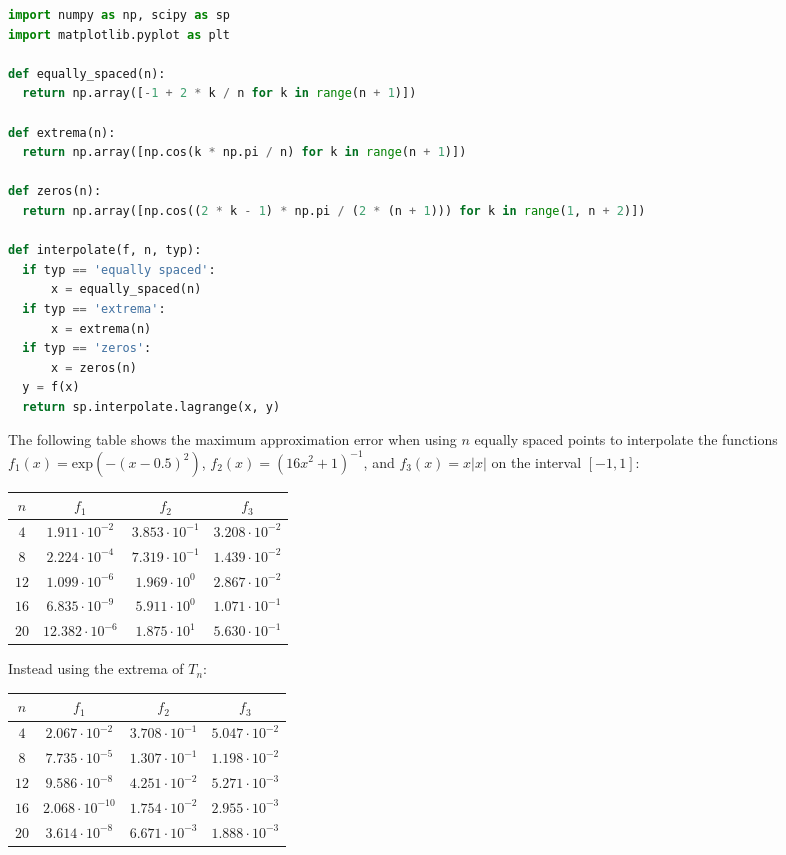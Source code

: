 \documentclass{article}
\begin{document}
\begin{lstlisting}[language=Python]
import numpy as np, scipy as sp
import matplotlib.pyplot as plt

def equally_spaced(n):
  return np.array([-1 + 2 * k / n for k in range(n + 1)])

def extrema(n):
  return np.array([np.cos(k * np.pi / n) for k in range(n + 1)])

def zeros(n):
  return np.array([np.cos((2 * k - 1) * np.pi / (2 * (n + 1))) for k in range(1, n + 2)])

def interpolate(f, n, typ):
  if typ == 'equally spaced':
      x = equally_spaced(n)
  if typ == 'extrema':
      x = extrema(n)
  if typ == 'zeros':
      x = zeros(n)
  y = f(x)
  return sp.interpolate.lagrange(x, y)
\end{lstlisting}
The following table shows the maximum approximation error when using $n$ equally spaced points to interpolate the functions $f_1(x) = \mathrm{exp}(-(x - 0.5)^2)$, $f_2(x) = {(16x^2 + 1)}^{-1}$, and $f_3(x) = x|x|$ on the interval $[-1, 1]$:
\begin{center}
\begin{tabular}{|c|c|c|c|}
    \hline
    $n$ & $f_1$ & $f_2$ & $f_3$ \\ 
    \hline
    $4$ & $1.911 \cdot 10^{-2}$ & $3.853 \cdot 10^{-1}$ & $3.208 \cdot 10^{-2}$ \\
    \hline
    $8$ & $2.224 \cdot 10^{-4}$ & $7.319 \cdot 10^{-1}$ & $1.439 \cdot 10^{-2}$ \\
    \hline
    $12$ & $1.099 \cdot 10^{-6}$ & $1.969 \cdot 10^0$ & $2.867 \cdot 10^{-2}$ \\
    \hline
    $16$ & $6.835 \cdot 10^{-9}$ & $5.911 \cdot 10^0$ & $1.071 \cdot 10^{-1}$ \\
    \hline
    $20$ & $12.382 \cdot 10^{-6}$ & $1.875 \cdot 10^1$ & $5.630 \cdot 10^{-1}$ \\
    \hline
\end{tabular}
\end{center}
Instead using the extrema of $T_n$:
\begin{center}
\begin{tabular}{|c|c|c|c|}
    \hline
    $n$ & $f_1$ & $f_2$ & $f_3$ \\ 
    \hline
    $4$ & $2.067 \cdot 10^{-2}$ & $3.708 \cdot 10^{-1}$ & $5.047 \cdot 10^{-2}$ \\
    \hline
    $8$ & $7.735 \cdot 10^{-5}$ & $1.307 \cdot 10^{-1}$ & $1.198 \cdot 10^{-2}$ \\
    \hline
    $12$ & $9.586 \cdot 10^{-8}$ & $4.251 \cdot 10^{-2}$ & $5.271 \cdot 10^{-3}$ \\
    \hline
    $16$ & $2.068 \cdot 10^{-10}$ & $1.754 \cdot 10^{-2}$ & $2.955 \cdot 10^{-3}$ \\
    \hline
    $20$ & $3.614 \cdot 10^{-8}$ & $6.671 \cdot 10^{-3}$ & $1.888 \cdot 10^{-3}$ \\
    \hline
\end{tabular}
\end{center}
\end{document}
